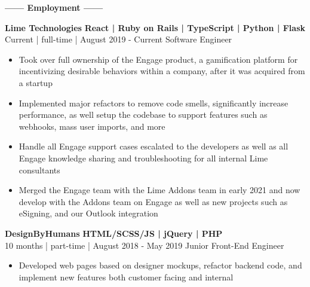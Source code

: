\documentclass[12pt]{article}
\begin{document}
    \begin{center}
    \textbf{\Large------ Employment ------}\\
    \end{center}
    \vspace{-2mm}
    \begin{footnotesize}
    \flushleft
    \textbf{\color{primary}\large Lime Technologies} \hfill \textbf{\color{Cerulean}React | Ruby on Rails | TypeScript | Python | Flask }\\ 
    {\color{primary}Current | full-time | August 2019 - Current} \hfill {\color{Cerulean} Software Engineer}
    \vspace{-2mm}
    \begin{itemize}
        \setlength{\itemsep}{0pt}
        \item Took over full ownership of the Engage product, a gamification platform for incentivizing desirable behaviors within a company, after it was acquired from a startup
        \item Implemented major refactors to remove code smells, significantly increase performance, as well setup the codebase to support features such as webhooks, mass user imports, and more
        \item Handle all Engage support cases escalated to the developers as well as all Engage knowledge sharing and troubleshooting for all internal Lime consultants
        \item Merged the Engage team with the Lime Addons team in early 2021 and now develop with the Addons team on Engage as well as new projects such as eSigning, and our Outlook integration
    \end{itemize}
    
    \flushleft
    
    \textbf{\color{primary}\large DesignByHumans} \hfill \textbf{\color{Cerulean}HTML/SCSS/JS | jQuery | PHP}\\ 
    {\color{primary}10 months | part-time | August 2018 - May 2019} \hfill {\color{Cerulean} Junior Front-End Engineer}
    \vspace{-2mm}
    \begin{itemize}
        \setlength{\itemsep}{0pt}
        \item Developed web pages based on designer mockups, refactor backend code, and implement new features both customer facing and internal
    \end{itemize}
    \end{footnotesize}
    
\end{document}

